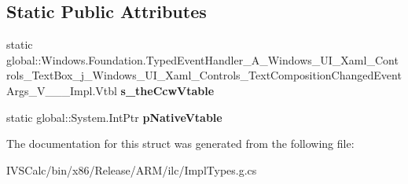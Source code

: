 \subsection*{Static Public Attributes}
\begin{DoxyCompactItemize}
\item 
\mbox{\label{struct_windows_1_1_foundation_1_1_typed_event_handler___a___windows___u_i___xaml___controls___te0b038d62b9928b8ea6f0314c4279430d_a69be16b5766407edf999c94a4f1f5412}} 
static global\+::\+Windows.\+Foundation.\+Typed\+Event\+Handler\+\_\+\+A\+\_\+\+Windows\+\_\+\+U\+I\+\_\+\+Xaml\+\_\+\+Controls\+\_\+\+Text\+Box\+\_\+j\+\_\+\+Windows\+\_\+\+U\+I\+\_\+\+Xaml\+\_\+\+Controls\+\_\+\+Text\+Composition\+Changed\+Event\+Args\+\_\+\+V\+\_\+\+\_\+\+\_\+\+Impl.\+Vtbl {\bfseries s\+\_\+the\+Ccw\+Vtable}
\item 
\mbox{\label{struct_windows_1_1_foundation_1_1_typed_event_handler___a___windows___u_i___xaml___controls___te0b038d62b9928b8ea6f0314c4279430d_a92e172307dc391b9065f52c573012728}} 
static global\+::\+System.\+Int\+Ptr {\bfseries p\+Native\+Vtable}
\end{DoxyCompactItemize}


The documentation for this struct was generated from the following file\+:\begin{DoxyCompactItemize}
\item 
I\+V\+S\+Calc/bin/x86/\+Release/\+A\+R\+M/ilc/Impl\+Types.\+g.\+cs\end{DoxyCompactItemize}
